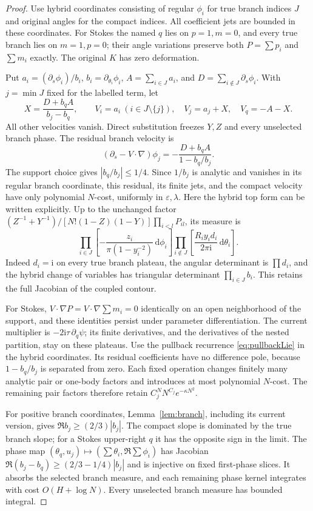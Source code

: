 \documentclass[11pt]{article}
\numberwithin{equation}{section}
\theoremstyle{definition}
\newcommand{\dd}{\,\mathrm d}
\newcommand{\ii}{\mathrm i}
\newcommand{\eps}{\varepsilon}
\begin{document}
\begin{proof}
Use hybrid coordinates consisting of regular \(\phi_i\) for true
branch indices \(J\) and original angles for the compact indices.
All coefficient jets are bounded in these coordinates.
For Stokes the named \(q\) lies on \(p=1,m=0\), and every true
branch lies on \(m=1,p=0\); their angle variations preserve both
\(P=\sum p_i\) and \(\sum m_i\) exactly.
The original \(K\) has zero deformation.

Put \(a_i=(\partial_s\phi_i)/b_i\),
\(b_i=\partial_{\theta_i}\phi_i\),
\(A=\sum_{i\in J}a_i\), and
\(D=\sum_{i\notin J}\partial_s\phi_i\).
With \(j=\min J\) fixed for the labelled term, let
\[
 X=\frac{D+b_qA}{b_j-b_q},\qquad
 V_i=a_i\ (i\in J\setminus\{j\}),\quad
 V_j=a_j+X,\quad V_q=-A-X .
 \]
All other velocities vanish. Direct substitution freezes \(Y,Z\)
and every unselected branch phase. The residual branch velocity is
\[
 (\partial_s-V\cdot\nabla)\phi_j
       =-\frac{D+b_qA}{1-b_q/b_j}.
\]
The support choice gives \(|b_q/b_j|\le1/4\).
Since \(1/b_j\) is analytic and vanishes in its regular branch
coordinate, this residual, its finite jets, and the compact
velocity have only polynomial \(N\)-cost, uniformly in \(\eps,\lambda\).
Here the hybrid top form can be written explicitly. Up to the
unchanged factor \((Z^{-1}+Y^{-1})/[N!(1-Z)(1-Y)]\prod_{i<l}P_{il}\),
its measure is
\[
 \prod_{i\in J}\left[-\frac{z_i}{\pi(1-y_i^{-2})}\dd\phi_i\right]
 \prod_{i\notin J}\left[\frac{R_i y_i d_i}{2\pi\ii}\dd\theta_i\right].
\]
Indeed \(d_i=\ii\) on every true branch plateau, the angular
determinant is \(\prod d_i\), and the hybrid change of variables
has triangular determinant \(\prod_{i\in J}b_i\).
This retains the full Jacobian of the coupled contour.

For Stokes, \(V\cdot\nabla P=V\cdot\nabla\sum m_i=0\) identically
on an open neighborhood of the support, and these identities persist
under parameter differentiation. The current multiplier is
\(-2\ii\tau\,\partial_q\psi\); its finite derivatives, and the
derivatives of the nested partition, stay on these plateaus.
Use the pullback recurrence \eqref{eq:pullbackLie} in the hybrid
coordinates. Its residual coefficients have no difference pole,
because \(1-b_q/b_j\) is separated from zero. Each fixed operation
changes finitely many analytic pair or one-body factors and
introduces at most polynomial \(N\)-cost. The remaining pair
factors therefore retain
\(C_j^N N^{C_j}e^{-\kappa N^2}\).

For positive branch coordinates, Lemma~\ref{lem:branch}, including
its current version, gives \(\Re b_j\ge(2/3)|b_j|\).
The compact slope is dominated by the true branch slope; for a
Stokes upper-right \(q\) it has the opposite sign in the limit.
The phase map
\((\theta_q,u_j)\mapsto(\sum\theta_i,\Re\sum\phi_i)\)
has Jacobian \(\Re(b_j-b_q)\ge(2/3-1/4)|b_j|\)
and is injective on fixed first-phase slices.
It absorbs the selected branch measure, and each remaining phase
kernel integrates with cost \(O(H+\log N)\).
Every unselected branch measure has bounded integral.


\end{proof}
\end{document}
